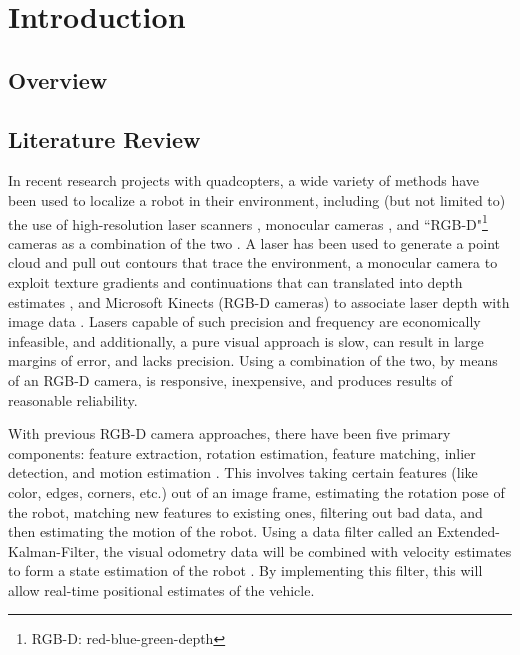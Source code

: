 \documentclass[letterpaper, oneside, 10pt]{report}
\begin{document}
\tableofcontents
\listoffigures
\listoftables
\clearpage

\doublespacing

\chapter{Introduction}

\section{Overview}
\section{Literature Review}

In recent research projects with quadcopters, a wide variety of methods have been used to localize a robot in their environment, including (but not limited to) the use of high-resolution laser scanners \cite{bachrach2011range,shen2011autonomous}, monocular cameras \cite{soundararaj2009autonomous}, and ``RGB-D"\footnote{RGB-D: red-blue-green-depth} cameras as a combination of the two \cite{huang2011visual}. A laser has been used to generate a point cloud and pull out contours that trace the environment\cite{bachrach2011range}, a monocular camera to exploit texture gradients and continuations that can translated into depth estimates \cite{soundararaj2009autonomous}, and Microsoft Kinects (RGB-D cameras) to associate laser depth with image data \cite{huang2011visual}. Lasers capable of such precision and frequency are economically infeasible, and additionally, a pure visual approach is slow, can result in large margins of error, and lacks precision. Using a combination of the two, by means of an RGB-D camera, is responsive,  inexpensive, and produces results of reasonable reliability.


With previous RGB-D camera approaches, there have been five primary components: feature extraction, rotation estimation, feature matching, inlier detection, and motion estimation \cite{huang2011visual}. This involves taking certain features (like color, edges, corners, etc.) out of an image frame, estimating the rotation pose of the robot, matching new features to existing ones, filtering out bad data, and then estimating the motion of the robot. Using a data filter called an Extended-Kalman-Filter, the visual odometry data will be combined with velocity estimates to form a state estimation of the robot \cite{huang2011visual}. By implementing this filter, this will allow real-time positional estimates of the vehicle.
\end{document}

